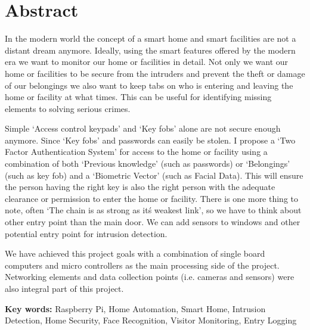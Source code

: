 \chapter*{Abstract}
\begin{flushleft}
    In the modern world the concept of a smart home and smart facilities are not a distant dream anymore.
    Ideally, using the smart features offered by the modern era we want to monitor our home or facilities
    in detail. Not only we want our home or facilities to be secure from the intruders and prevent the theft
    or damage of our belongings we also want to keep tabs on who is entering and leaving the home or facility
    at what times. This can be useful for identifying missing elements to solving serious crimes.
    \vspace{.5cm}

    Simple `Access control keypads' and `Key fobs' alone are not secure enough anymore. Since `Key fobs' and
    passwords can easily be stolen. I propose a `Two Factor Authentication System' for access to the home or
    facility using a combination of both `Previous knowledge' (such as passwords) or `Belongings' (such as key fob)
    and a `Biometric Vector' (such as Facial Data). This will ensure the person having the right key is also the right
    person with the adequate clearance or permission to enter the home or facility. There is one more thing to note,
    often `The chain is as strong as it\'s weakest link', so we have to think about other entry point than the main
    door. We can add sensors to windows and other potential entry point for intrusion detection.
    \vspace{.5cm}

    We have achieved this project goals with a combination of single board computers and micro controllers as
    the main processing side of the project. Networking elements and data collection points (i.e. cameras and sensors)
    were also integral part of this project.
    \vspace{.5cm}

    \textbf{Key words: }Raspberry Pi, Home Automation, Smart Home, Intrusion Detection, Home Security, Face Recognition,
    Visitor Monitoring, Entry Logging


\end{flushleft}
